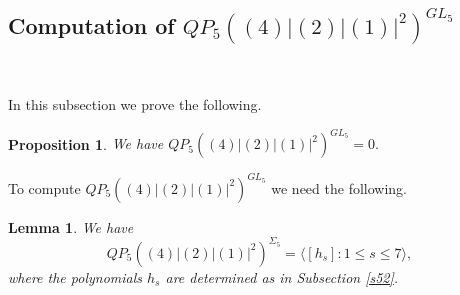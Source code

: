 \documentclass[reqno]{amsart}
\theoremstyle{plain}
\theoremstyle{definition}
\theoremstyle{plain}
\newtheorem{props}[thms]{Proposition}
\newtheorem{lems}[thms]{Lemma}
\theoremstyle{definition}
\numberwithin{equation}{section}
\begin{document}
\subsection{Computation of $QP_5((4)|(2)|(1)|^2)^{GL_5}$}\

\smallskip
In this subsection we prove the following.

\begin{props}\label{mdt1} We have 
$QP_5((4)|(2)|(1)|^2)^{GL_5} = 0.$
\end{props}
To compute $QP_5((4)|(2)|(1)|^2)^{GL_5}$ we need the following.
\begin{lems}\label{bdt1} We have 
$$QP_5((4)|(2)|(1)|^2)^{\Sigma_5} = \langle [h_s]: 1 \leqslant s \leqslant 7\rangle, $$
where the polynomials $h_s$ are determined as in Subsection \ref{s52}.
\end{lems}
\end{document}
